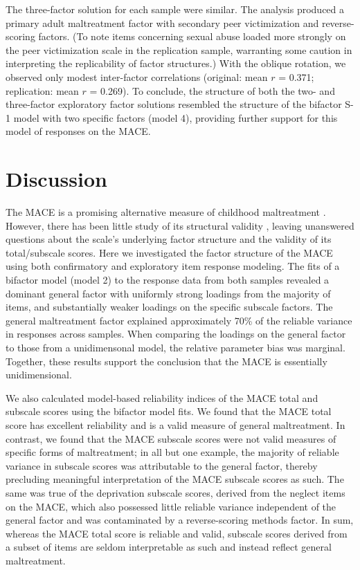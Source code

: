 \documentclass[letterpaper,man,natbib,floatsintext,longtable]{apa6}
\begin{document}
The three-factor solution for each sample were similar. The analysis produced a primary adult maltreatment factor with secondary peer victimization and reverse-scoring factors. (To note items concerning sexual abuse loaded more strongly on the peer victimization scale in the replication sample, warranting some caution in interpreting the replicability of factor structures.) With the oblique rotation, we observed only modest inter-factor correlations (original: mean $r$ = 0.371; replication: mean $r$ = 0.269). To conclude, the structure of both the two- and three-factor exploratory factor solutions resembled the structure of the bifactor S-1 model with two specific factors (model 4), providing further support for this model of responses on the MACE. 

\section{Discussion}

The MACE is a promising alternative measure of childhood maltreatment \citep{georgieva2022systematic}. However, there has been little study of its structural validity \citep{saini2019systematic}, leaving unanswered questions about the scale's underlying factor structure and the validity of its total/subscale scores. Here we investigated the factor structure of the MACE using both confirmatory and exploratory item response modeling. The fits of a bifactor model (model 2) to the response data from both samples revealed a dominant general factor with uniformly strong loadings from the majority of items, and substantially weaker loadings on the specific subscale factors. The general maltreatment factor explained approximately 70\% of the reliable variance in responses across samples. When comparing the loadings on the general factor to those from a unidimensonal model, the relative parameter bias was marginal. Together, these results support the conclusion that the MACE is essentially unidimensional. 

We also calculated model-based reliability indices of the MACE total and subscale scores using the bifactor model fits. We found that the MACE total score has excellent reliability and is a valid measure of general maltreatment. In contrast, we found that the MACE subscale scores were not valid measures of specific forms of maltreatment; in all but one example, the majority of reliable variance in subscale scores was attributable to the general factor, thereby precluding meaningful interpretation of the MACE subscale scores as such. The same was true of the deprivation subscale scores, derived from the neglect items on the MACE, which also possessed little reliable variance independent of the general factor and was contaminated by a reverse-scoring methods factor. In sum, whereas the MACE total score is reliable and valid, subscale scores derived from a subset of items are seldom interpretable as such and instead reflect general maltreatment.  
\end{document}
